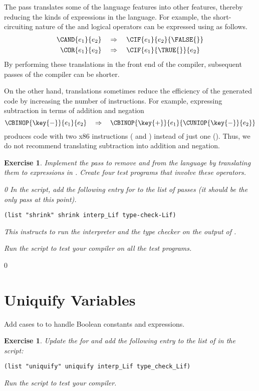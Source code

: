 \documentclass[7x10]{TimesAPriori_MIT}%
\def\racketEd{0}
\def\edition{1}
\newtheorem{exercise}[theorem]{Exercise}
\numberwithin{theorem}{chapter}
\numberwithin{definition}{chapter}
\numberwithin{equation}{chapter}
\begin{document}
The  pass translates some of the language features into
other features, thereby reducing the kinds of expressions in the
language. For example, the short-circuiting nature of the 
and  logical operators can be expressed using  as
follows.
\begin{align*}
  \CAND{e_1}{e_2} & \quad \Rightarrow \quad \CIF{e_1}{e_2}{\FALSE{}}\\
  \COR{e_1}{e_2} & \quad \Rightarrow \quad \CIF{e_1}{\TRUE{}}{e_2}
\end{align*}
By performing these translations in the front end of the compiler,
subsequent passes of the compiler can be shorter.

On the other hand, translations sometimes reduce the efficiency of the
generated code by increasing the number of instructions. For example,
expressing subtraction in terms of addition and negation
\[
\CBINOP{\key{-}}{e_1}{e_2} \quad \Rightarrow \quad
  \CBINOP{\key{+}}{e_1}{ \CUNIOP{\key{-}}{e_2} }
\]
produces code with two x86 instructions ( and )
instead of just one (). Thus, we do not recommend
translating subtraction into addition and negation.

\begin{exercise}\normalfont\normalsize
%
Implement the pass  to remove  and  from
the language by translating them to  expressions in \LangIf{}.
%
Create four test programs that involve these operators.
%
{\if\edition\racketEd    
In the  script, add the following entry for
 to the list of passes (it should be the only pass at
this point).
\begin{lstlisting}
(list "shrink" shrink interp_Lif type-check-Lif)
\end{lstlisting}
This instructs  to run the interpreter
 and the type checker  on the
output of .
\fi}
%
Run the script to test your compiler on all the test programs.
\end{exercise}

{\if\edition\racketEd    

\section{Uniquify Variables}
\label{sec:uniquify-Lif}

Add cases to  to handle Boolean constants and
 expressions.

\begin{exercise}\normalfont\normalsize
Update the  for \LangIf{} and add the following
entry to the list of  in the  script:
\begin{lstlisting}
(list "uniquify" uniquify interp_Lif type_check_Lif)
\end{lstlisting}
Run the script to test your compiler.
\end{exercise}

\fi}
\end{document}
